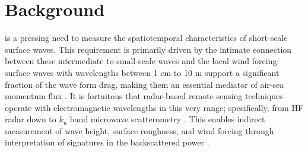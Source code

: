 \documentclass[letterpaper,draftcls,onecolumn]{IEEEtran}
\begin{document}
\IEEEpeerreviewmaketitle

\section{Background}
\label{sec:intro}
 is a pressing need to measure the spatiotemporal characteristics of short-scale surface waves. This requirement is primarily driven by the intimate connection between these intermediate to small-scale waves and the local wind forcing: surface waves with wavelengths between 1 cm to 10 m support a significant fraction of the wave form drag, making them an essential mediator of air-sea momentum flux \cite{Makin1995}. It is fortuitous that radar-based remote sensing techniques operate with electromagnetic wavelengths in this very range; specifically, from HF radar down to $k_u$ band microwave scatterometry \cite{plant_bragg_1990}. This enables indirect measurement of wave height, surface roughness, and wind forcing through interpretation of signatures in the backscattered power \cite{morales-marquez_hf_2025}.
\end{document}
